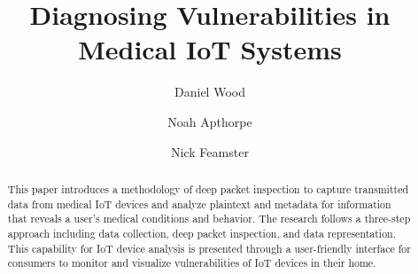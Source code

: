 \documentclass[sigconf]{acmart}
\begin{document}
\title{Diagnosing Vulnerabilities in Medical IoT Systems} %
\author{Daniel Wood}
\author{Noah Apthorpe}
\author{Nick Feamster}

\renewcommand{\shortauthors}{D. Wood et al.}


\begin{abstract}
This paper introduces a methodology of deep packet inspection to capture transmitted data from medical IoT devices and analyze plaintext and metadata for information that reveals a user's medical conditions and behavior. The research follows a three-step approach including data collection, deep packet inspection, and data representation. This capability for IoT device analysis is presented through a user-friendly interface for consumers to monitor and visualize vulnerabilities of IoT devices in their home.
\end{abstract}


\maketitle




\end{document}
